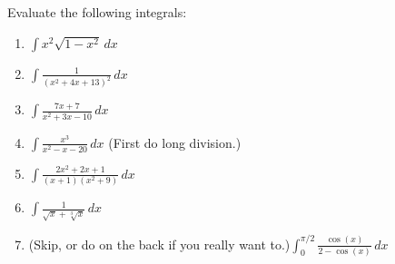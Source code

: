 \documentclass[12pt]{article}
\newcommand{\di}{\displaystyle}
\begin{document}
\newpage


Evaluate the following integrals:

 \begin{enumerate}


 \item $\di \int x^2\sqrt{1-x^2}\,dx$
 
 \vspace{2.25in}

 \item $\di \int \frac{1}{(x^2+4x+13)^2}\,dx$

\vspace{2.25in}

 \item $\di \int \frac{7x+7}{x^2+3x-10}\,dx$





 
\newpage

 \item $\di \int \frac{x^3}{x^2-x-20}\,dx$ (First do long division.)

\vspace{2.25in}

 \item $\di \int \frac{2x^2+2x+1}{(x+1)(x^2+9)}\,dx$

\vspace{2.25in}
 
 \item $\di \int \frac{1}{\sqrt{x}+\sqrt[3]{x}}\,dx$
 
 \vspace{2.25in}
 
 \item (Skip, or do on the back if you really want to.)$\di \int_0^{\pi/2}\frac{\cos(x)}{2-\cos(x)}\,dx$
 \end{enumerate}
\end{document}
